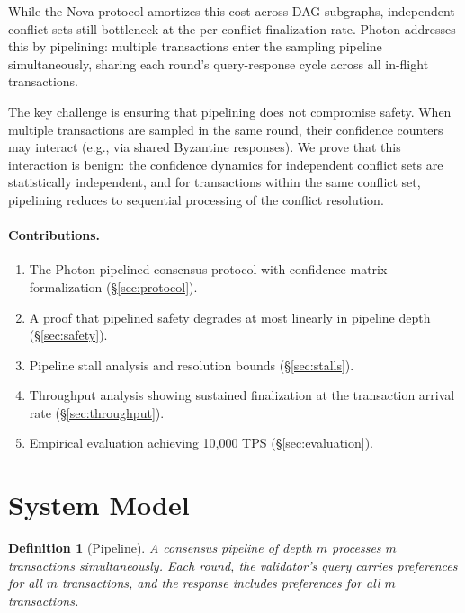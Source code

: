 \documentclass[11pt,a4paper]{article}
\newtheorem{definition}{Definition}[section]
\begin{document}
While the Nova protocol amortizes this cost across DAG subgraphs, independent conflict
sets still bottleneck at the per-conflict finalization rate. Photon addresses this by
pipelining: multiple transactions enter the sampling pipeline simultaneously, sharing
each round's query-response cycle across all in-flight transactions.

The key challenge is ensuring that pipelining does not compromise safety. When multiple
transactions are sampled in the same round, their confidence counters may interact
(e.g., via shared Byzantine responses). We prove that this interaction is benign: the
confidence dynamics for independent conflict sets are statistically independent, and
for transactions within the same conflict set, pipelining reduces to sequential processing
of the conflict resolution.

\paragraph{Contributions.}
\begin{enumerate}[nosep]
\item The Photon pipelined consensus protocol with confidence matrix formalization (\S\ref{sec:protocol}).
\item A proof that pipelined safety degrades at most linearly in pipeline depth (\S\ref{sec:safety}).
\item Pipeline stall analysis and resolution bounds (\S\ref{sec:stalls}).
\item Throughput analysis showing sustained finalization at the transaction arrival rate (\S\ref{sec:throughput}).
\item Empirical evaluation achieving 10,000 TPS (\S\ref{sec:evaluation}).
\end{enumerate}

\section{System Model}
\label{sec:model}

\begin{definition}[Pipeline]
A consensus pipeline of depth $m$ processes $m$ transactions simultaneously. Each
round, the validator's query carries preferences for all $m$ transactions, and the
response includes preferences for all $m$ transactions.
\end{definition}
\end{document}
